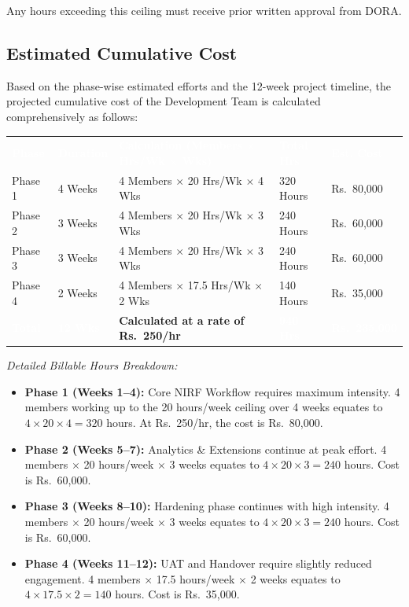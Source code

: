 \documentclass[11pt]{article}
\renewcommand{\arraystretch}{1.15}
\begin{document}
Any hours exceeding this ceiling must receive prior written approval from DORA.

\subsection{Estimated Cumulative Cost}
Based on the phase-wise estimated efforts and the 12-week project timeline, the projected cumulative cost of the Development Team is calculated comprehensively as follows:

\begin{table}[h]
\centering
\renewcommand{\arraystretch}{1.4}
\begin{tabular}{p{1.5cm} p{2cm} p{6cm} p{2cm} p{2cm}}
\rowcolor{primary}
\textcolor{white}{\textbf{Phase}} & \textcolor{white}{\textbf{Duration}} & \textcolor{white}{\textbf{Calculation (Members $\times$ Hrs/Wk $\times$ Wks)}} & \textcolor{white}{\textbf{Total Hrs}} & \textcolor{white}{\textbf{Est. Cost}} \\
\rowcolor{lightbg}
Phase 1 & 4 Weeks & 4 Members $\times$ 20 Hrs/Wk $\times$ 4 Wks & 320 Hours & Rs.~80,000 \\
\rowcolor{white}
Phase 2 & 3 Weeks & 4 Members $\times$ 20 Hrs/Wk $\times$ 3 Wks & 240 Hours & Rs.~60,000 \\
\rowcolor{lightbg}
Phase 3 & 3 Weeks & 4 Members $\times$ 20 Hrs/Wk $\times$ 3 Wks & 240 Hours & Rs.~60,000 \\
\rowcolor{white}
Phase 4 & 2 Weeks & 4 Members $\times$ 17.5 Hrs/Wk $\times$ 2 Wks & 140 Hours & Rs.~35,000 \\
\rowcolor{secondary}
\textcolor{white}{\textbf{Total}} & \textcolor{white}{\textbf{12 Wks}} & \textbf{Calculated at a rate of Rs.~250/hr} & \textcolor{white}{\textbf{940 Hrs}} & \textcolor{white}{\textbf{Rs.~235,000}} \\
\end{tabular}
\end{table}

\textit{Detailed Billable Hours Breakdown:}
\begin{itemize}[leftmargin=1.4em, itemsep=3pt]
\item \textbf{Phase 1 (Weeks 1--4):} Core NIRF Workflow requires maximum intensity. 4 members working up to the 20 hours/week ceiling over 4 weeks equates to $4 \times 20 \times 4 = 320$ hours. At Rs.~250/hr, the cost is Rs.~80,000.
\item \textbf{Phase 2 (Weeks 5--7):} Analytics \& Extensions continue at peak effort. 4 members $\times$ 20 hours/week $\times$ 3 weeks equates to $4 \times 20 \times 3 = 240$ hours. Cost is Rs.~60,000.
\item \textbf{Phase 3 (Weeks 8--10):} Hardening phase continues with high intensity. 4 members $\times$ 20 hours/week $\times$ 3 weeks equates to $4 \times 20 \times 3 = 240$ hours. Cost is Rs.~60,000.
\item \textbf{Phase 4 (Weeks 11--12):} UAT and Handover require slightly reduced engagement. 4 members $\times$ 17.5 hours/week $\times$ 2 weeks equates to $4 \times 17.5 \times 2 = 140$ hours. Cost is Rs.~35,000.
\end{itemize}
\end{document}
